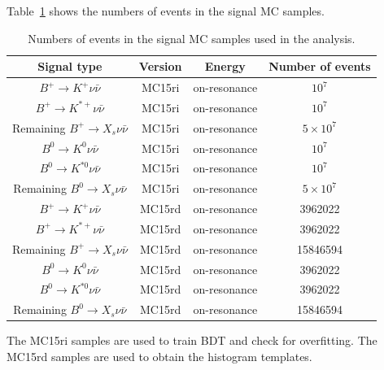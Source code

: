 Table~\ref{tab:MC_signal} shows the numbers of events in the signal MC samples.
\begin{table}
\caption{Numbers of events in the signal MC samples used in the analysis.}
    \centering
    \begin{tabular}{ p{5cm} p{5cm} p{5cm} p{5cm}  }
    \hline
    \hline
    \multicolumn{1}{c}{Signal type} & \multicolumn{1}{c}{Version} & \multicolumn{1}{c}{Energy} & \multicolumn{1}{c}{Number of events} \\
    \hline
    \multicolumn{1}{c}{$B^{+}\rightarrow K^{+} \nu \bar{\nu}$} & \multicolumn{1}{c}{MC15ri} & \multicolumn{1}{c}{on-resonance} & \multicolumn{1}{c}{$10^{7}$}\\
    \multicolumn{1}{c}{$B^{+}\rightarrow K^{*+} \nu \bar{\nu}$} & \multicolumn{1}{c}{MC15ri} & \multicolumn{1}{c}{on-resonance} & \multicolumn{1}{c}{$10^{7}$}\\
    \multicolumn{1}{c}{Remaining $B^{+}\rightarrow X_{s} \nu \bar{\nu}$} & \multicolumn{1}{c}{MC15ri} & \multicolumn{1}{c}{on-resonance} & \multicolumn{1}{c}{$5 \times 10^{7}$}\\
    \multicolumn{1}{c}{$B^{0}\rightarrow K^{0} \nu \bar{\nu}$} & \multicolumn{1}{c}{MC15ri} & \multicolumn{1}{c}{on-resonance} & \multicolumn{1}{c}{$10^{7}$}\\
    \multicolumn{1}{c}{$B^{0}\rightarrow K^{*0} \nu \bar{\nu}$} & \multicolumn{1}{c}{MC15ri} & \multicolumn{1}{c}{on-resonance} & \multicolumn{1}{c}{$10^{7}$}\\
    \multicolumn{1}{c}{Remaining $B^{0}\rightarrow X_{s} \nu \bar{\nu}$} & \multicolumn{1}{c}{MC15ri} & \multicolumn{1}{c}{on-resonance} & \multicolumn{1}{c}{$5 \times 10^{7}$}\\
    \multicolumn{1}{c}{$B^{+}\rightarrow K^{+} \nu \bar{\nu}$} & \multicolumn{1}{c}{MC15rd} & \multicolumn{1}{c}{on-resonance} & \multicolumn{1}{c}{3962022}\\
    \multicolumn{1}{c}{$B^{+}\rightarrow K^{*+} \nu \bar{\nu}$} & \multicolumn{1}{c}{MC15rd} & \multicolumn{1}{c}{on-resonance} & \multicolumn{1}{c}{3962022}\\
    \multicolumn{1}{c}{Remaining $B^{+}\rightarrow X_{s} \nu \bar{\nu}$} & \multicolumn{1}{c}{MC15rd} & \multicolumn{1}{c}{on-resonance} & \multicolumn{1}{c}{15846594}\\
    \multicolumn{1}{c}{$B^{0}\rightarrow K^{0} \nu \bar{\nu}$} & \multicolumn{1}{c}{MC15rd} & \multicolumn{1}{c}{on-resonance} & \multicolumn{1}{c}{3962022}\\
    \multicolumn{1}{c}{$B^{0}\rightarrow K^{*0} \nu \bar{\nu}$} & \multicolumn{1}{c}{MC15rd} & \multicolumn{1}{c}{on-resonance} & \multicolumn{1}{c}{3962022}\\
    \multicolumn{1}{c}{Remaining $B^{0}\rightarrow X_{s} \nu \bar{\nu}$} & \multicolumn{1}{c}{MC15rd} & \multicolumn{1}{c}{on-resonance} & \multicolumn{1}{c}{15846594}\\
  \hline
  \hline
\end{tabular}
    \label{tab:MC_signal}
\end{table}
The MC15ri samples are used to train BDT and check for overfitting. The MC15rd samples are used to obtain the histogram templates.

